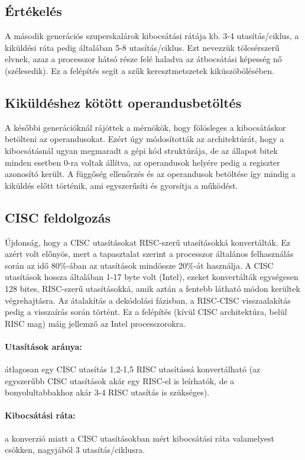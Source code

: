 \subsection{Értékelés}
A második generációs szuperskalárok kibocsátási rátája kb. 3-4 utasítás/ciklus, a kiküldési ráta pedig általában 5-8 utasítás/ciklus.
Ezt nevezzük tölcsérszerű elvnek, azaz a processzor hátsó része felé haladva az átbocsátási képesség nő (szélesedik).
Ez a felépítés segít a szűk keresztmetszetek kiküszöbölésében.

\subsection{Kiküldéshez kötött operandusbetöltés}
A későbbi generációknál rájöttek a mérnökök, hogy fölösleges a kibocsátáskor betölteni az operandusokat.
Ezért úgy módosították az architektúrát, hogy a kibocsátásnál ugyan megmaradt a gépi kód struktúrája, de az állapot bitek minden esetben 0-ra voltak állítva, az operandusok helyére pedig a regiszter azonosító került.
A függőség ellenőrzés és az operandusok betöltése így mindig a kiküldés előtt történik, ami egyszerűsíti és gyorsítja a működést.

\subsection{CISC feldolgozás}
Újdonság, hogy a CISC utasításokat RISC-szerű utasításokká konvertálták.
Ez azért volt előnyös, mert a tapasztalat szerint a processzor általános felhasználás során az idő 80\%-ában az utasítások mindössze 20\%-át használja.
A CISC utasítások hossza általában 1-17 byte volt (Intel), ezeket konvertálták egységesen 128 bites, RISC-szerű utasításokká, amik aztán a fentebb látható módon kerültek végrehajtásra.
Az átalakítás a dekódolási fázisban, a RISC-CISC visszaalakítás pedig a visszaírás során történt.
Ez a felépítés (kívül CISC architektúra, belül RISC mag) máig jellemző az Intel processzorokra.
\paragraph{Utasítások aránya:} átlagosan egy CISC utasítás 1,2-1,5 RISC utasítássá konvertálható (az egyszerűbb CISC utasítások akár egy RISC-el is leírhatók, de a bonyolultabbakhoz akár 3-4 RISC utasítás is szükséges).
\paragraph{Kibocsátási ráta:} a konverzió miatt a CISC utasításokban mért kibocsátási ráta valamelyest csökken, nagyjából 3 utasítás/ciklusra.


